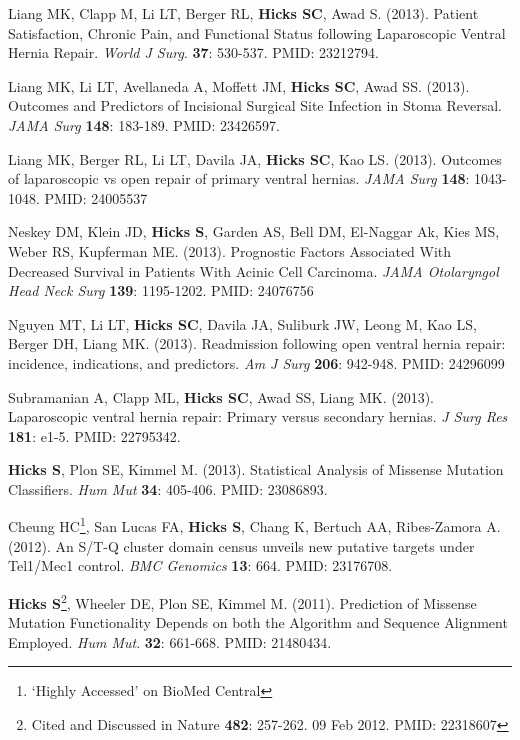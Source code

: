 \documentclass[10pt]{article}
\begin{document}
\begin{enumerate}[label= {[\arabic*]}]
\item Liang MK, Clapp M, Li LT, Berger RL, {\bf Hicks SC}, Awad S. (2013). Patient Satisfaction, Chronic Pain, and Functional Status following Laparoscopic Ventral Hernia Repair. {\it World J Surg}. {\bf 37}: 530-537. PMID: 23212794. 
\item Liang MK, Li LT, Avellaneda A, Moffett JM, {\bf Hicks SC}, Awad SS. (2013). Outcomes and Predictors of Incisional Surgical Site Infection in Stoma Reversal. {\it JAMA Surg} {\bf 148}: 183-189. PMID: 23426597. 
\item Liang MK, Berger RL, Li LT, Davila JA, {\bf Hicks SC}, Kao LS. (2013). Outcomes of laparoscopic vs open repair of primary ventral hernias. {\it JAMA Surg} {\bf 148}: 1043-1048. PMID: 24005537 
\item Neskey DM, Klein JD, {\bf Hicks S}, Garden AS, Bell DM, El-Naggar Ak, Kies MS, Weber RS, Kupferman ME. (2013). Prognostic Factors Associated With Decreased Survival in Patients With Acinic Cell Carcinoma. {\it JAMA Otolaryngol Head Neck Surg} {\bf 139}: 1195-1202. PMID: 24076756
\item Nguyen MT, Li LT, {\bf Hicks SC}, Davila JA, Suliburk JW, Leong M, Kao LS, Berger DH, Liang MK. (2013). Readmission following open ventral hernia repair: incidence, indications, and predictors. {\it Am J Surg} {\bf 206}: 942-948. PMID: 24296099
\item Subramanian A, Clapp ML, {\bf Hicks SC}, Awad SS, Liang MK. (2013). Laparoscopic ventral hernia repair: Primary versus secondary hernias. {\it J Surg Res} {\bf 181}: e1-5. PMID: 22795342.
\item \textbf{Hicks S}, Plon SE, Kimmel M. (2013). Statistical Analysis of Missense Mutation Classifiers. {\it Hum Mut} {\bf 34}: 405-406. PMID: 23086893. 
\item Cheung HC\footnote{ `Highly Accessed' on BioMed Central}, San Lucas FA, \textbf{Hicks S}, Chang K, Bertuch AA, Ribes-Zamora A. (2012). An S/T-Q cluster domain census unveils new putative targets under Tel1/Mec1 control. {\it BMC Genomics} {\bf 13}: 664. PMID: 23176708. 
\item \textbf{Hicks S}\footnote{Cited and Discussed in Nature {\bf 482}: 257-262. 09 Feb 2012. PMID: 22318607}, Wheeler DE, Plon SE, Kimmel M. (2011). Prediction of Missense Mutation Functionality Depends on both the Algorithm and Sequence Alignment Employed. {\it Hum Mut}. {\bf 32}: 661-668. PMID: 21480434.
\end{enumerate}
\end{document}

